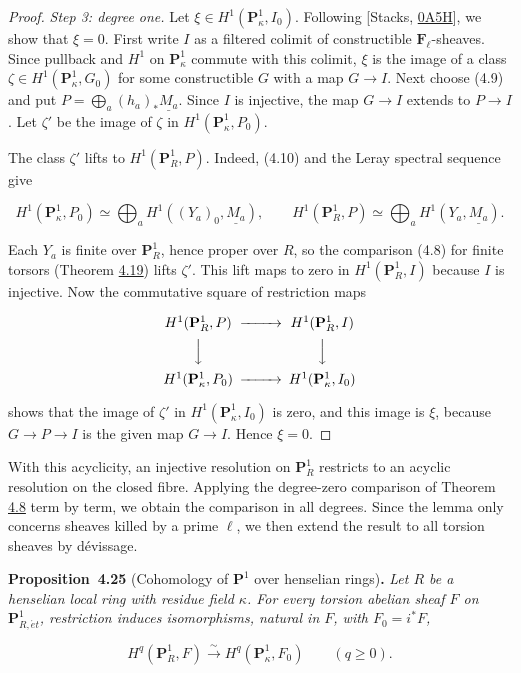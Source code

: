 \documentclass[11pt]{article}
\newenvironment{bpstatement}[2]{\par\addvspace{0.6\baselineskip}\noindent\textbf{#1}#2\textbf{.}\enspace\ignorespaces}
  {\par\addvspace{0.4\baselineskip}}
\newenvironment{bpstatementit}[2]{\begin{bpstatement}{#1}{#2}\itshape\ignorespaces}{\end{bpstatement}}
\begin{document}
\begin{proof}[{Proof}]
\emph{Step 3: degree one.} Let \(\xi\in H^1(\mathbf P^1_\kappa,I_0)\). Following [Stacks, \href{https://stacks.math.columbia.edu/tag/0A5H}{0A5H}], we show that \(\xi=0\). First write \(I\) as a filtered colimit of constructible \(\mathbf F_\ell\)-sheaves. Since pullback and \(H^1\) on \(\mathbf P^1_\kappa\) commute with this colimit, \(\xi\) is the image of a class \(\zeta\in H^1(\mathbf P^1_\kappa,G_0)\) for some constructible \(G\) with a map \(G\to I\). Next choose (4.9) and put \(P=\bigoplus_a(h_a)_*\underline{M_a}\). Since \(I\) is injective, the map \(G\to I\) extends to \(P\to I\). Let \(\zeta'\) be the image of \(\zeta\) in \(H^1(\mathbf P^1_\kappa,P_0)\).

The class \(\zeta'\) lifts to \(H^1(\mathbf P^1_R,P)\). Indeed, (4.10) and the Leray spectral sequence give

\[
H^1(\mathbf P^1_\kappa,P_0)
\simeq\bigoplus_a H^1((Y_a)_0,\underline{M_a}),\qquad
H^1(\mathbf P^1_R,P)\simeq\bigoplus_a H^1(Y_a,\underline{M_a}).
\]

Each \(Y_a\) is finite over \(\mathbf P^1_R\), hence proper over \(R\), so the comparison (4.8) for finite torsors (Theorem \hyperref[bp53]{4.19}) lifts \(\zeta'\). This lift maps to zero in \(H^1(\mathbf P^1_R,I)\) because \(I\) is injective. Now the commutative square of restriction maps

\[
\begin{CD}
H^1(\mathbf P^1_R,P) @>>> H^1(\mathbf P^1_R,I)\\
@VVV @VVV\\
H^1(\mathbf P^1_\kappa,P_0) @>>> H^1(\mathbf P^1_\kappa,I_0)
\end{CD}
\]

shows that the image of \(\zeta'\) in \(H^1(\mathbf P^1_\kappa,I_0)\) is zero, and this image is \(\xi\), because \(G\to P\to I\) is the given map \(G\to I\). Hence \(\xi=0\).
\end{proof}

\label{bp70}%
With this acyclicity, an injective resolution on \(\mathbf P^1_R\) restricts to an acyclic resolution on the closed fibre. Applying the degree-zero comparison of Theorem \hyperref[bp24]{4.8} term by term, we obtain the comparison in all degrees. Since the lemma only concerns sheaves killed by a prime \(\ell\), we then extend the result to all torsion sheaves by dévissage.

\label{bp71}%
\begin{bpstatementit}{Proposition~4.25}{ (Cohomology of $\mathbf P^1$ over henselian rings)}
Let \(R\) be a henselian local ring with residue field \(\kappa\). For every torsion abelian sheaf \(F\) on \(\mathbf P^1_{R,\acute{e}t}\), restriction induces isomorphisms, natural in \(F\), with \(F_0=i^*F\),

\[
H^q(\mathbf P^1_R,F)\xrightarrow{\sim}
H^q(\mathbf P^1_\kappa,F_0)\qquad(q\geq0).
\]
\end{bpstatementit}
\end{document}
